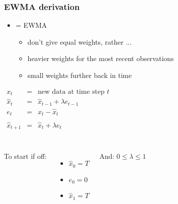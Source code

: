 \begin{frame}\frametitle{EWMA derivation}
	\begin{itemize}
		\item	{\color{purple}{Exponentially Weighted Moving Average}} = EWMA
		\begin{itemize}
			\item	don't give equal weights, rather ...
			\item	heavier weights for the most recent observations
			\item	small weights further back in time
		\end{itemize}
	\end{itemize}

	$
	\begin{array}{rcl}
		x_t &=& \text{new data at time step } t\\
		\hat{x}_t &=& \hat{x}_{t-1} + \lambda e_{t-1} \\
		e_t &=& x_t - \hat{x}_t \\
		\\
		\hat{x}_{t+1} &=& \hat{x}_{t} + \lambda e_{t} \\
		\\
	\end{array}
	$

	\begin{columns}[t]
			To start if off:
			\begin{itemize}
				\item	$\hat{x}_0 = T$
				\item	$e_0 = 0$
				\item	$\hat{x}_1 = T$
			\end{itemize}
			And: $0 \leq \lambda \leq 1$
	\end{columns}
	
\end{frame}

